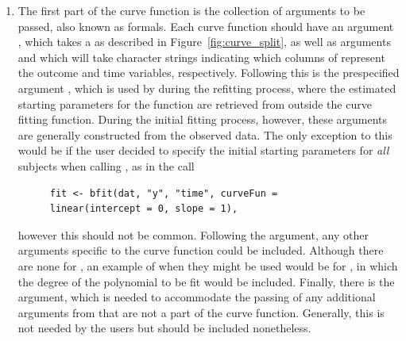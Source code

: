 \begin{enumerate}
\item The first part of the curve function is the collection of arguments to be passed, also known as formals. Each curve function should have an argument , which takes a  as described in Figure~\ref{fig:curve_split}, as well as arguments  and  which will take character strings indicating which columns of  represent the outcome and time variables, respectively. Following this is the prespecified argument , which is used by  during the refitting process, where the estimated starting parameters for the function are retrieved from outside the curve fitting function. During the initial fitting process, however, these arguments are generally constructed from the observed data. The only exception to this would be if the user decided to specify the initial starting parameters for \textit{all} subjects when calling , as in the call

\begin{singlespace}
\begin{figure}[H]
\centering
\begin{BVerbatim}
fit <- bfit(dat, "y", "time", curveFun = linear(intercept = 0, slope = 1),
\end{BVerbatim}
\end{figure}
\end{singlespace}
however this should not be common. Following the  argument, any other arguments specific to the curve function could be included. Although there are none for , an example of when they might be used would be for , in which the degree of the polynomial to be fit would be included. Finally, there is the  argument, which is needed to accommodate the passing of any additional arguments from  that are not a part of the curve function. Generally, this is not needed by the users but should be included nonetheless. 


\end{enumerate}
